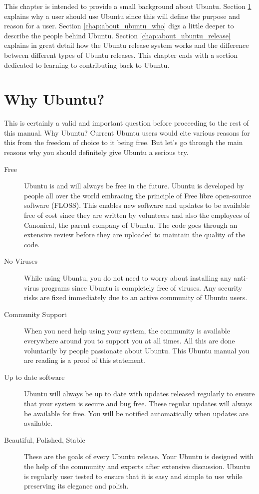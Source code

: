 This chapter is intended to provide a small background about Ubuntu. Section \ref{chap:about_ubuntu_why} explains why a user should use Ubuntu since this will define the purpose and reason for a user. Section \ref{chap:about_ubuntu_who} digs a little deeper to describe the people behind Ubuntu. Section \ref{chap:about_ubuntu_release} explains in great detail how the Ubuntu release system works and the difference between different types of Ubuntu releases. This chapter ends with a section dedicated to learning to contributing back to Ubuntu.

\section{Why Ubuntu?} \label{chap:about_ubuntu_why}
This is certainly a valid and important question before proceeding to the rest of this manual. Why Ubuntu? Current Ubuntu users would cite various reasons for this from the freedom of choice to it being free. But let's go through the main reasons why you should definitely give Ubuntu a serious try.

\begin{description}
\item [Free] Ubuntu is and will always be free in the future. Ubuntu is developed by people all over the world embracing the principle of Free libre open-source software (FLOSS). This enables new software and updates to be available free of cost since they are written by volunteers and also the employees of Canonical, the parent company of Ubuntu. The code goes through an extensive review before they are uploaded to maintain the quality of the code.

\item [No Viruses] While using Ubuntu, you do not need to worry about installing any anti-virus programs since Ubuntu is completely free of viruses. Any security risks are fixed immediately due to an active community of Ubuntu users. 

\item [Community Support] When you need help using your system, the community is available everywhere around you to support you at all times. All this are done voluntarily by people passionate about Ubuntu. This Ubuntu manual you are reading is a proof of this statement. 

\item [Up to date software] Ubuntu will always be up to date with updates released regularly to ensure that your system is secure and bug free. These regular updates will always be available for free. You will be notified automatically when updates are available.

\item [Beautiful, Polished, Stable] These are the goals of every Ubuntu release. Your Ubuntu is designed with the help of the community and experts after extensive discussion. Ubuntu is regularly user tested to ensure that it is easy and simple to use while preserving its elegance and polish.
\end{description}

